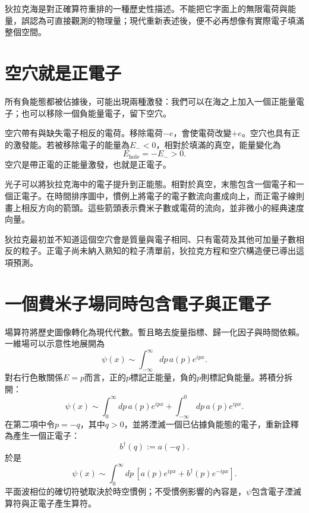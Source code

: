 狄拉克海是對正確算符重排的一種歷史性描述。不能把它字面上的無限電荷與能量，誤認為可直接觀測的物理量；現代重新表述後，便不必再想像有實際電子填滿整個空間。

\section{空穴就是正電子}

所有負能態都被佔據後，可能出現兩種激發：我們可以在海之上加入一個正能量電子；也可以移除一個負能量電子，留下空穴。

空穴帶有與缺失電子相反的電荷。移除電荷\(-e\)，會使電荷改變\(+e\)。空穴也具有正的激發能。若被移除電子的能量為\(E_-<0\)，相對於填滿的真空，能量變化為
\begin{equation}
E_{\mathrm{hole}}=-E_->0.
\end{equation}
空穴是帶正電的正能量激發，也就是正電子。

光子可以將狄拉克海中的電子提升到正能態。相對於真空，末態包含一個電子和一個正電子。在時間排序圖中，慣例上將電子的電子數流向畫成向上，而正電子線則畫上相反方向的箭頭。這些箭頭表示費米子數或電荷的流向，並非微小的經典速度向量。

\begin{classroomqa}
\end{classroomqa}

狄拉克最初並不知道這個空穴會是質量與電子相同、只有電荷及其他可加量子數相反的粒子。正電子尚未納入熟知的粒子清單前，狄拉克方程和空穴構造便已導出這項預測。

\section{一個費米子場同時包含電子與正電子}

場算符將歷史圖像轉化為現代代數。暫且略去旋量指標、歸一化因子與時間依賴。一維場可以示意性地展開為
\begin{equation}
\psi(x)
\sim
\int_{-\infty}^{\infty}dp\,a(p)e^{ipx}.
\label{eq:l10-full-field-integral}
\end{equation}
對右行色散關係\(E=p\)而言，正的\(p\)標記正能量，負的\(p\)則標記負能量。將積分拆開：
\begin{equation}
\psi(x)
\sim
\int_0^\infty dp\,a(p)e^{ipx}
+
\int_{-\infty}^0 dp\,a(p)e^{ipx}.
\end{equation}
在第二項中令\(p=-q\)，其中\(q>0\)，並將湮滅一個已佔據負能態的電子，重新詮釋為產生一個正電子：
\begin{equation}
b^\dagger(q):=a(-q).
\end{equation}
於是
\begin{equation}
\psi(x)
\sim
\int_0^\infty dp\,
\left[
a(p)e^{ipx}
+
b^\dagger(p)e^{-ipx}
\right].
\label{eq:l10-electron-positron-split}
\end{equation}
平面波相位的確切符號取決於時空慣例；不受慣例影響的內容是，\(\psi\)包含電子湮滅算符與正電子產生算符。

